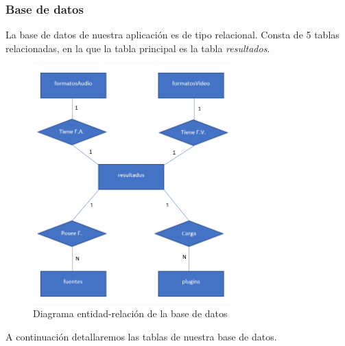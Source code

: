 \subsubsection{Base de datos}
La base de datos de nuestra aplicación es de tipo relacional. Consta de 5 tablas relacionadas, en la que la tabla principal es la tabla \textit{resultados}.
\begin{figure}[tbp]
    \centering
    \includegraphics[width=0.68\textwidth]{Images/entidad relacion.png}
    \caption{Diagrama entidad-relación de la base de datos}
    \label{fig:diagramaEntidadRelacion}
\end{figure}
A continuación detallaremos las tablas de nuestra base de datos.
